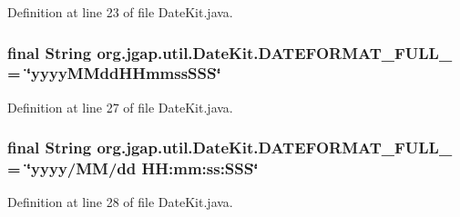 Definition at line 23 of file Date\-Kit.\-java.

\hypertarget{classorg_1_1jgap_1_1util_1_1_date_kit_ab54ce445a14668d8045a3952f2293622}{
\subsubsection[{D\-A\-T\-E\-F\-O\-R\-M\-A\-T\-\_\-\-F\-U\-L\-L\-\_\-0}]{\setlength{\rightskip}{0pt plus 5cm}final String org.\-jgap.\-util.\-Date\-Kit.\-D\-A\-T\-E\-F\-O\-R\-M\-A\-T\-\_\-\-F\-U\-L\-L\-\_ = \char`\"{}yyyy\-M\-Mdd\-H\-Hmmss\-S\-S\-S\char`\"{}\hspace{0.3cm}{\ttfamily [static]}}}\label{classorg_1_1jgap_1_1util_1_1_date_kit_ab54ce445a14668d8045a3952f2293622}


Definition at line 27 of file Date\-Kit.\-java.

\hypertarget{classorg_1_1jgap_1_1util_1_1_date_kit_a65db97cf5c49ed0c7716d09621f3e0c3}{
\subsubsection[{D\-A\-T\-E\-F\-O\-R\-M\-A\-T\-\_\-\-F\-U\-L\-L\-\_\-1}]{\setlength{\rightskip}{0pt plus 5cm}final String org.\-jgap.\-util.\-Date\-Kit.\-D\-A\-T\-E\-F\-O\-R\-M\-A\-T\-\_\-\-F\-U\-L\-L\-\_ = \char`\"{}yyyy/M\-M/dd H\-H\-:mm\-:ss\-:\-S\-S\-S\char`\"{}\hspace{0.3cm}{\ttfamily [static]}}}\label{classorg_1_1jgap_1_1util_1_1_date_kit_a65db97cf5c49ed0c7716d09621f3e0c3}


Definition at line 28 of file Date\-Kit.\-java.

